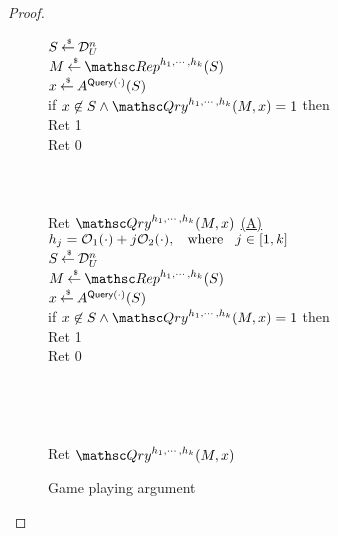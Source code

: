\begin{proof}
\begin{figure}[h]
{{$S {\:\stackrel{{\scriptscriptstyle \hspace{0.2em}\$}} {\leftarrow}\:} \mathcal{D}_{U}^{n}$\\
$M \getsr \Rep^{h_1, \cdots, h_k}(S)$\\
$x {\:\stackrel{{\scriptscriptstyle \hspace{0.2em}\$}} {\leftarrow}\:} A^{\mathsf{Query}(\cdot)}(S)$\\
if $x \not\in S \wedge \Qry^{h_1, \cdots, h_k}(M,x)=1$ then\\
\nudge Ret 1\\
Ret 0\\\\\\
%
\\
Ret $\Qry^{h_1, \cdots, h_k}(M,x)$
}
{
\underline{(A)}\\
$h_j = {\cal O}_1(\cdot) + j{\cal O}_2(\cdot), \hspace*{2ex} \mathrm{where} \hspace*{2ex} j \in [1,k]$\\
$S {\:\stackrel{{\scriptscriptstyle \hspace{0.2em}\$}} {\leftarrow}\:} \mathcal{D}_{U}^{n}$\\
$M \getsr \Rep^{h_1, \cdots, h_k}(S)$\\
$x {\:\stackrel{{\scriptscriptstyle \hspace{0.2em}\$}} {\leftarrow}\:} A^{\mathsf{Query}(\cdot)}(S)$\\
if $x \not\in S \wedge \Qry^{h_1, \cdots, h_k}(M,x)=1$ then\\
\nudge Ret 1\\
Ret 0\\\\\\\\
%
\\
Ret $\Qry^{h_1, \cdots, h_k}(M,x)$
}
}
\caption{Game playing argument}\label{fig:Game}
\end{figure}


\end{proof}
